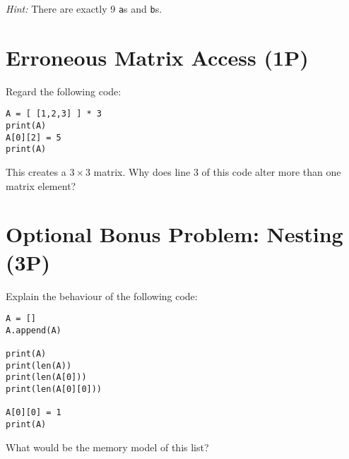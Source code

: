 \documentclass[
	ngerman,
	fontsize=10pt,
	parskip=half,
	titlepage=true,
	DIV=12
]{scrartcl}
\begin{document}
\emph{Hint:} There are exactly 9 \texttt{a}s and \texttt{b}s.


\section{Erroneous Matrix Access (1\;P)}
Regard the following code:

\begin{verbatim}
A = [ [1,2,3] ] * 3
print(A)
A[0][2] = 5
print(A)
\end{verbatim}

This creates a $3 \times 3$ matrix. Why does line 3 of this code alter more than one matrix element?


\section*{Optional Bonus Problem: Nesting (3\;P)}
Explain the behaviour of the following code:

\begin{verbatim}
A = []
A.append(A)

print(A)
print(len(A))
print(len(A[0]))
print(len(A[0][0]))

A[0][0] = 1
print(A)
\end{verbatim}

What would be the memory model of this list?
\end{document}
